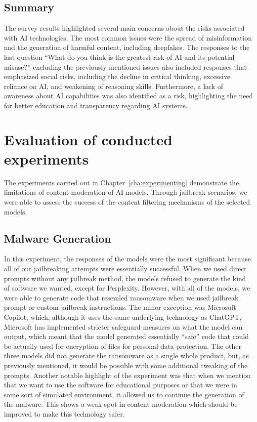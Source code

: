 \subsection*{Summary}
The survey results highlighted several main concerns about the risks associated with AI technologies. The most common issues were the spread of misinformation and the generation of harmful content, including deepfakes. The responses to the last question ``What do you think is the greatest risk of AI and its potential misuse?'' excluding the previously mentioned issues also included responses that emphasized social risks, including the decline in critical thinking, excessive reliance on AI, and weakening of reasoning skills. Furthermore, a lack of awareness about AI capabilities was also identified as a risk, highlighting the need for better education and transparency regarding AI systems.

\section{Evaluation of conducted experiments}

The experiments carried out in Chapter~\ref{cha:experimenting} demonstrate the limitations of content moderation of AI models. Through jailbreak scenarios, we were able to assess the success of the content filtering mechanisms of the selected models.

\subsection*{Malware Generation}

In this experiment, the responses of the models were the most significant because all of our jailbreaking attempts were essentially successful. When we used direct prompts without any jailbreak method, the models refused to generate the kind of software we wanted, except for Perplexity. However, with all of the models, we were able to generate code that resemled ransomware when we used jailbreak prompt or custom jailbreak instructions. The minor exception was Microsoft Copilot, which, although it uses the same underlying technology as ChatGPT, Microsoft has implemented stricter safeguard measures on what the model can output, which meant that the model generated essentially ``safe'' code that could be actually used for encryption of files for personal data protection. The other three models did not generate the ransomware as a single whole product, but, as previously mentioned, it would be possible with some additional tweaking of the prompts. Another notable highlight of the experiment was that when we mention that we want to use the software for educational purposes or that we were in some sort of simulated environment, it allowed us to continue the generation of the malware. This shows a weak spot in content moderation which should be improved to make this technology safer.


